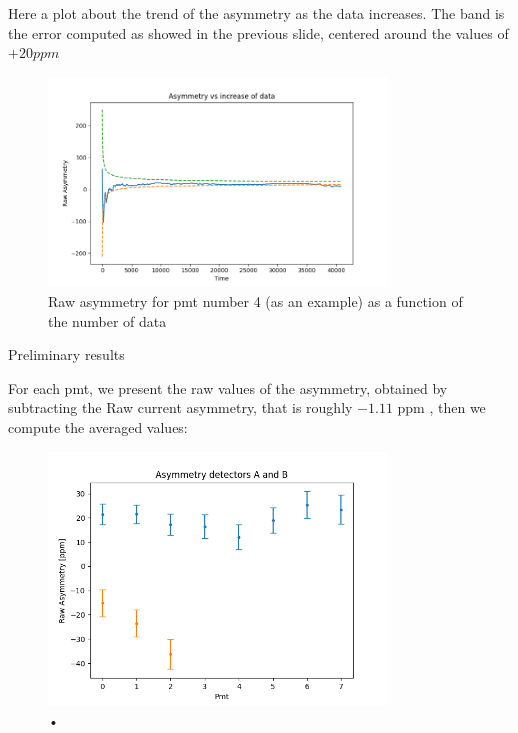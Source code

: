 \documentclass[8pt,a4paper]{beamer}
\begin{document}
\begin{frame}

Here a plot about the trend of the asymmetry as the data increases. The band is the error computed as showed in the previous slide, centered around the values of $+20ppm$

\begin{figure}[hbtp]
\centering
\includegraphics[width = 0.8\textwidth]{figures/Asymmetry_vs_data.png}
\caption{Raw asymmetry for pmt number 4 (as an example) as a function of the number of data}
\end{figure}

\end{frame}

\begin{frame}{Preliminary results}

For each pmt, we present the raw values of the asymmetry, obtained by subtracting the Raw current asymmetry, that is roughly $-1.11$ ppm , then we compute the averaged values:

\begin{figure}[hbtp]
\centering
\includegraphics[width = 0.8\textwidth]{figures/RawResults.png}
\caption{•}
\end{figure}
\end{frame}
\end{document}
